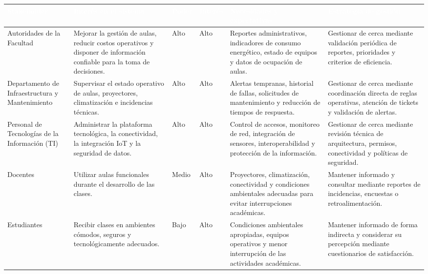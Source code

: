 \begingroup
\small
\begin{longtable}{|P{0.1667}|P{0.1667}|P{0.1667}|P{0.1667}|P{0.1667}|P{0.1667}|}
\hline
{}\textcolor{white}{\textbf{Stakeholder}} & \textcolor{white}{\textbf{Interés en el sistema}} & \textcolor{white}{\textbf{Poder}} & \textcolor{white}{\textbf{Interés}} & \textcolor{white}{\textbf{Necesidades y expectativas}} & \textcolor{white}{\textbf{Estrategia de gestión}} \\ \hline
Autoridades de la Facultad & Mejorar la gestión de aulas, reducir costos operativos y disponer de información confiable para la toma de decisiones. & Alto & Alto & Reportes administrativos, indicadores de consumo energético, estado de equipos y datos de ocupación de aulas. & Gestionar de cerca mediante validación periódica de reportes, prioridades y criterios de eficiencia. \\ \hline
Departamento de Infraestructura y Mantenimiento & Supervisar el estado operativo de aulas, proyectores, climatización e incidencias técnicas. & Alto & Alto & Alertas tempranas, historial de fallas, solicitudes de mantenimiento y reducción de tiempos de respuesta. & Gestionar de cerca mediante coordinación directa de reglas operativas, atención de tickets y validación de alertas. \\ \hline
Personal de Tecnologías de la Información (TI) & Administrar la plataforma tecnológica, la conectividad, la integración IoT y la seguridad de datos. & Alto & Alto & Control de accesos, monitoreo de red, integración de sensores, interoperabilidad y protección de la información. & Gestionar de cerca mediante revisión técnica de arquitectura, permisos, conectividad y políticas de seguridad. \\ \hline
Docentes & Utilizar aulas funcionales durante el desarrollo de las clases. & Medio & Alto & Proyectores, climatización, conectividad y condiciones ambientales adecuadas para evitar interrupciones académicas. & Mantener informado y consultar mediante reportes de incidencias, encuestas o retroalimentación. \\ \hline
Estudiantes & Recibir clases en ambientes cómodos, seguros y tecnológicamente adecuados. & Bajo & Alto & Condiciones ambientales apropiadas, equipos operativos y menor interrupción de las actividades académicas. & Mantener informado de forma indirecta y considerar su percepción mediante cuestionarios de satisfacción. \\ \hline

\end{longtable}
